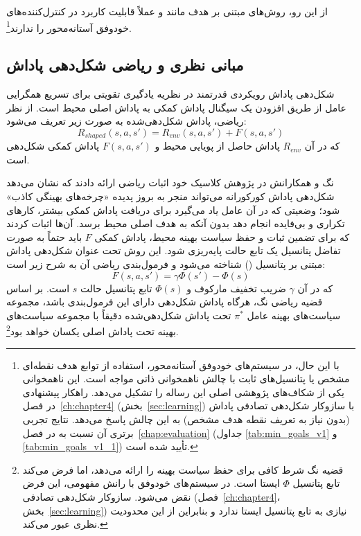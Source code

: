\documentclass[oneside,openany,phd]{TMU-Thesis}
\begin{document}
از این رو، روش‌های مبتنی بر هدف مانند  و  عملاً قابلیت کاربرد در کنترل‌کننده‌های خودوفق آستانه‌محور را ندارند\footnote{با این حال، در سیستم‌های خودوفق آستانه‌محور، استفاده از توابع هدف نقطه‌ای مشخص یا پتانسیل‌های ثابت با چالش ناهمخوانی ذاتی مواجه است. این ناهمخوانی یکی از شکاف‌های پژوهشی اصلی این رساله را تشکیل می‌دهد. راهکار پیشنهادی  در فصل~\ref{ch:chapter4} (بخش~\ref{sec:learning}) با سازوکار شکل‌دهی تصادفی پاداش (بدون نیاز به تعریف نقطه هدف مشخص) به این چالش پاسخ می‌دهد. نتایج تجربی برتری آن نسبت به  در فصل~\ref{chap:evaluation} (جداول \ref{tab:min_goals_v1} و \ref{tab:min_goals_v1_1}) تأیید شده است.}.

\subsection{مبانی نظری و ریاضی شکل‌دهی پاداش}
\label{sec:ch3_reward_shaping_math}

شکل‌دهی پاداش رویکردی قدرتمند در نظریه یادگیری تقویتی برای تسریع همگرایی عامل از طریق افزودن یک سیگنال پاداش کمکی به پاداش اصلی محیط است. از نظر ریاضی، پاداش شکل‌دهی‌شده به صورت زیر تعریف می‌شود:
\begin{equation}
    R_{shaped}(s, a, s') = R_{env}(s, a, s') + F(s, a, s')
\end{equation}
که در آن $R_{env}$ پاداش حاصل از پویایی محیط و $F(s, a, s')$ پاداش کمکی شکل‌دهی است.

نگ و همکارانش در پژوهش کلاسیک خود \cite{ng1999policy} اثبات ریاضی ارائه دادند که نشان می‌دهد شکل‌دهی پاداش کورکورانه می‌تواند منجر به بروز پدیده «چرخه‌های بهینگی کاذب» شود؛ وضعیتی که در آن عامل یاد می‌گیرد برای دریافت پاداش کمکی بیشتر، کارهای تکراری و بی‌فایده انجام دهد بدون آنکه به هدف اصلی محیط برسد. آن‌ها اثبات کردند که برای تضمین ثبات و حفظ سیاست بهینه محیط، پاداش کمکی $F$ باید حتماً به صورت تفاضل پتانسیل یک تابع حالت پایه‌ریزی شود. این روش تحت عنوان شکل‌دهی پاداش مبتنی بر پتانسیل () شناخته می‌شود \cite{ng1999policy} و فرمول‌بندی ریاضی آن به شرح زیر است:
\begin{equation}
    F(s, a, s') = \gamma \Phi(s') - \Phi(s)
\end{equation}
که در آن $\gamma$ ضریب تخفیف مارکوف و $\Phi(s)$ تابع پتانسیل حالت $s$ است. بر اساس قضیه ریاضی نگ، هرگاه پاداش شکل‌دهی دارای این فرمول‌بندی باشد، مجموعه سیاست‌های بهینه عامل $\pi^*$ تحت پاداش شکل‌دهی‌شده دقیقاً با مجموعه سیاست‌های بهینه تحت پاداش اصلی یکسان خواهد بود\footnote{قضیه نگ \cite{ng1999policy} شرط کافی برای حفظ سیاست بهینه را ارائه می‌دهد، اما فرض می‌کند تابع پتانسیل $\Phi$ ایستا است. در سیستم‌های خودوفق با رانش مفهومی، این فرض نقض می‌شود. سازوکار شکل‌دهی تصادفی  (فصل~\ref{ch:chapter4}، بخش~\ref{sec:learning}) نیازی به تابع پتانسیل ایستا ندارد و بنابراین از این محدودیت نظری عبور می‌کند.}.
\end{document}
